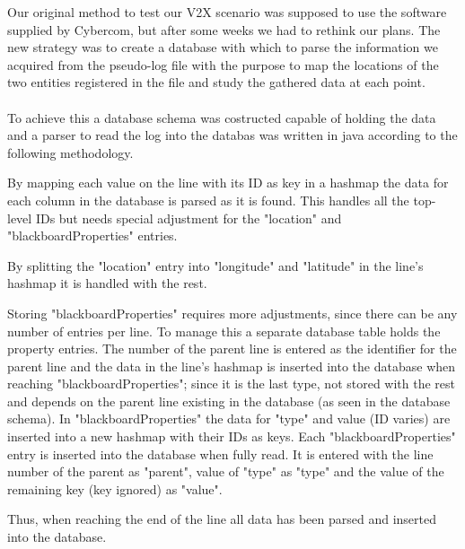 Our original method to test our V2X scenario was supposed to use the software supplied by Cybercom, but after some weeks we had to rethink our plans. The new strategy was to create a database with which to parse the information we acquired from the pseudo-log file with the purpose to map the locations of the two entities registered in the file and study the gathered data at each point. 

\paragraph{}
To achieve this a database schema was costructed capable of holding the data and a parser to read the log into the databas was written in java according to the following methodology.

By mapping each value on the line with its ID as key in a hashmap the data for each column in the database is parsed as it is found. This handles all the top-level IDs but needs special adjustment for the "location" and "blackboardProperties" entries.

By splitting the "location" entry into "longitude" and "latitude" in the line's hashmap it is handled with the rest.

Storing "blackboardProperties" requires more adjustments, since there can be any number of entries per line. To manage this a separate database table holds the property entries. The number of the parent line is entered as the identifier for the parent line and the data in the line's hashmap is inserted into the database when reaching "blackboardProperties"; since it is the last  type, not stored with the rest and depends on the parent line existing in the database (as seen in the database schema). In "blackboardProperties" the data for "type" and value (ID varies) are inserted into a new hashmap with their IDs as keys. Each "blackboardProperties" entry is inserted into the database when fully read. It is entered with the line number of the parent as "parent", value of "type" as "type" and the value of the remaining key (key ignored) as "value".

Thus, when reaching the end of the line all data has been parsed and inserted into the database.

